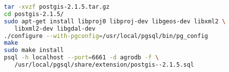 \label{appendix:postgis} 
\begin{lstlisting}[language=bash,caption={PostGIS installation}]
tar -xvzf postgis-2.1.5.tar.gz
cd postgis-2.1.5/
sudo apt-get install libproj0 libproj-dev libgeos-dev libxml2 \
   libxml2-dev libgdal-dev
./configure --with-pgconfig=/usr/local/pgsql/bin/pg_config
make
sudo make install
psql -h localhost --port=6661 -d agrodb -f \
   /usr/local/pgsql/share/extension/postgis--2.1.5.sql
\end{lstlisting} 
